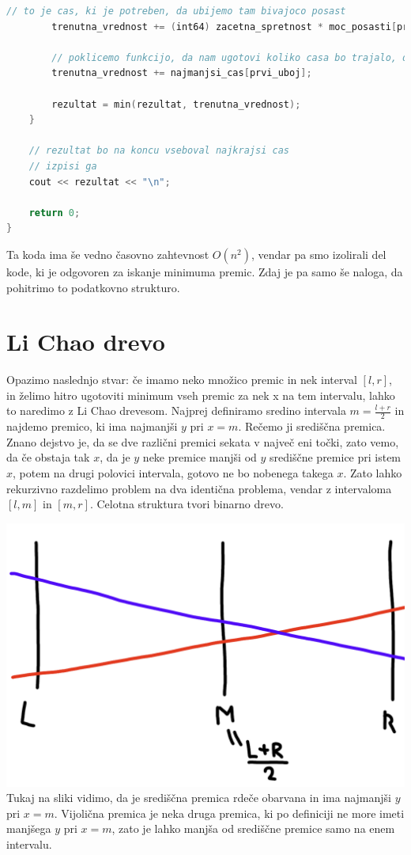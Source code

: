 \begin{lstlisting}[label={lst:code4}, language=C++]
        // to je cas, ki je potreben, da ubijemo tam bivajoco posast
        trenutna_vrednost += (int64) zacetna_spretnost * moc_posasti[prvi_uboj];

        // poklicemo funkcijo, da nam ugotovi koliko casa bo trajalo, da pridemo do konca
        trenutna_vrednost += najmanjsi_cas[prvi_uboj];

        rezultat = min(rezultat, trenutna_vrednost);
    }

    // rezultat bo na koncu vseboval najkrajsi cas
    // izpisi ga
    cout << rezultat << "\n";

    return 0;
}
\end{lstlisting}

Ta koda ima še vedno časovno zahtevnost $O(n^2)$, vendar pa smo izolirali del kode, ki je odgovoren za iskanje minimuma premic.
Zdaj je pa samo še naloga, da pohitrimo to podatkovno strukturo.

\section{Li Chao drevo}\label{sec:li-chao-drevo}
Opazimo naslednjo stvar: če imamo neko množico premic in nek interval $[l, r]$, in želimo hitro ugotoviti minimum vseh premic za nek x na tem intervalu, lahko to naredimo z Li Chao drevesom.
Najprej definiramo sredino intervala $m = \frac{l + r}{2}$ in najdemo premico, ki ima najmanjši $y$ pri $x = m$.
Rečemo ji središčna premica.
Znano dejstvo je, da se dve različni premici sekata v največ eni točki, zato vemo, da če obstaja tak $x$, da je $y$ neke premice manjši od $y$ središčne premice pri istem $x$, potem na drugi polovici intervala, gotovo ne bo nobenega takega $x$.
Zato lahko rekurzivno razdelimo problem na dva identična problema, vendar z intervaloma $[l, m]$ in $[m, r]$.
Celotna struktura tvori binarno drevo.

\includegraphics[scale=0.6]{image1}
Tukaj na sliki vidimo, da je središčna premica rdeče obarvana in ima najmanjši $y$ pri $x = m$.
Vijolična premica je neka druga premica, ki po definiciji ne more imeti manjšega $y$ pri $x = m$, zato je lahko manjša od središčne premice samo na enem intervalu.

